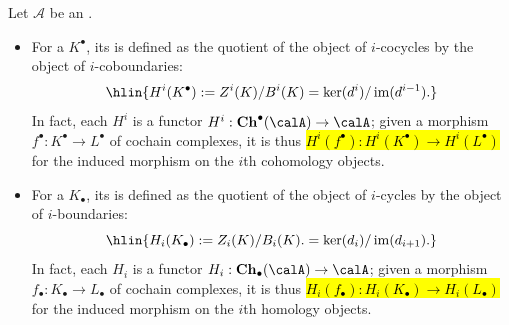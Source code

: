 \begin{definition} \label{definition:homology_and_cohomology_objects_for_a_chain_complex_in_an_abelian_category}
    Let $\mathcal{A}$ be an .
    
    \begin{itemize}
        \item For a  $K^\bullet$, its  is defined as the quotient of the object of $i$-cocycles by the object of $i$-coboundaries:
        $$ \hlin{H^i(K^\bullet) := Z^i(K) / B^i(K) = \ker(d^i) / \operatorname{im}(d^{i-1}).} $$
        In fact, each $H^i$ is a functor $H^i: \mathbf{Ch}^\bullet(\calA) \to \calA$; given a morphism $f^\bullet: K^\bullet \to L^\bullet$ of cochain complexes, it is thus  \hl{$H^i(f^\bullet): H^i(K^\bullet) \to H^i(L^\bullet)$} for the induced morphism on the $i$th cohomology objects.

        \item For a  $K_\bullet$, its  is defined as the quotient of the object of $i$-cycles by the object of $i$-boundaries:
        $$ \hlin{H_i(K_\bullet) := Z_i(K) / B_i(K). = \ker(d_i) / \operatorname{im}(d_{i+1}).} $$
        In fact, each $H_i$ is a functor $H_i: \mathbf{Ch}_\bullet(\calA) \to \calA$; given a morphism $f_\bullet: K_\bullet \to L_\bullet$ of cochain complexes, it is thus  \hl{$H_i(f_\bullet): H_i(K_\bullet) \to H_i(L_\bullet)$} for the induced morphism on the $i$th homology objects.
    \end{itemize}
\end{definition}
